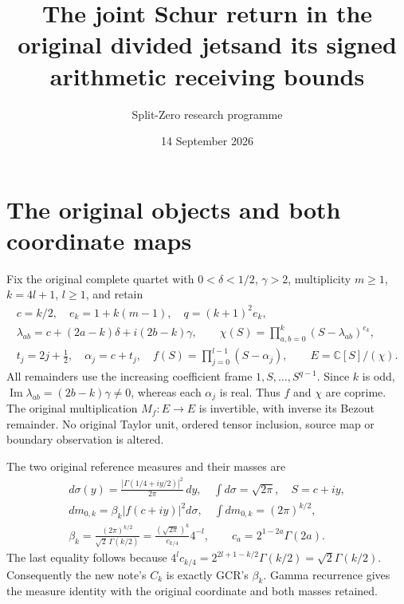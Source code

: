 \documentclass[11pt,a4paper]{article}
\title{The joint Schur return in the original divided jets\newline and its signed arithmetic receiving bounds}
\author{Split-Zero research programme}
\date{14 September 2026}
\newcommand{\C}{\mathbb C}
\begin{document}
\maketitle

\section{The original objects and both coordinate maps}

Fix the original complete quartet with
$0<\delta<1/2$, $\gamma>2$, multiplicity $m\geq1$,
$k=4l+1$, $l\geq1$, and retain
\[
\begin{gathered}
 c=k/2,\quad e_k=1+k(m-1),\quad q=(k+1)^2e_k,\\
 \lambda_{ab}=c+(2a-k)\delta+i(2b-k)\gamma,\qquad
 \chi(S)=\prod_{a,b=0}^k(S-\lambda_{ab})^{e_k},\\
 t_j=2j+\tfrac12,\quad\alpha_j=c+t_j,\quad
 f(S)=\prod_{j=0}^{l-1}(S-\alpha_j),\qquad
 E=\C[S]/(\chi).
\end{gathered}\tag{JSR1}
\]
All remainders use the increasing coefficient frame
$1,S,\ldots,S^{q-1}$. Since $k$ is odd,
$\operatorname{Im}\lambda_{ab}=(2b-k)\gamma\ne0$,
whereas each $\alpha_j$ is real. Thus $f$ and $\chi$ are coprime.
The original multiplication $M_f:E\to E$ is invertible, with
inverse its Bezout remainder. No original Taylor unit, ordered
tensor inclusion, source map or boundary observation is altered.

The two original reference measures and their masses are
\[
\begin{gathered}
 d\sigma(y)=\frac{|\Gamma(1/4+iy/2)|^2}{2\pi}\,dy,
 \quad\int d\sigma=\sqrt{2\pi},\quad S=c+iy,\\
 dm_{0,k}=\beta_k|f(c+iy)|^2d\sigma,
 \quad\int dm_{0,k}=(2\pi)^{k/2},\\
 \beta_k=\frac{(2\pi)^{k/2}}{\sqrt2\,\Gamma(k/2)}
        =\frac{(\sqrt{2\pi})^k}{c_{k/4}}4^{-l},
 \qquad c_a=2^{1-2a}\Gamma(2a).
\end{gathered}\tag{JSR2}
\]
The last equality follows because
$4^lc_{k/4}=2^{2l+1-k/2}\Gamma(k/2)=\sqrt2\Gamma(k/2)$.
Consequently the new note's $C_k$ is exactly GCR's $\beta_k$.
Gamma recurrence gives the measure identity with the original
coordinate and both masses retained.
\end{document}
